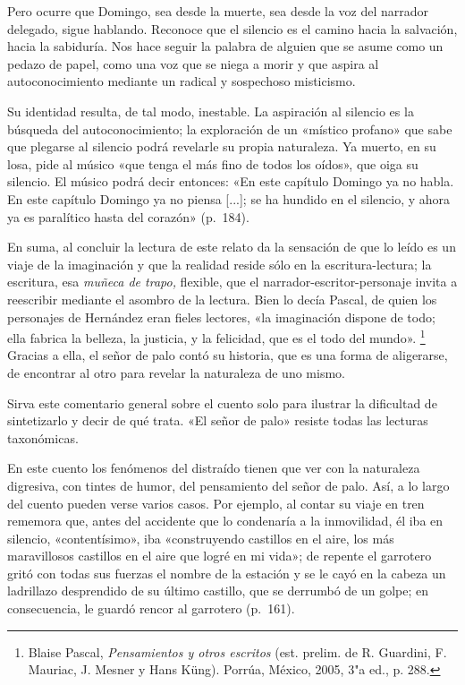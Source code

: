 \documentclass[14pt,twoside,final]{extbook} %
\let\oldfootnote\footnote
\renewcommand\footnote[1]{%
\oldfootnote{\hspace{1mm}#1}}
\begin{document}
Pero ocurre que Domingo, sea desde la muerte, sea desde la voz del narrador delegado, sigue hablando. Reconoce que el silencio es el camino hacia la salvación, hacia la sabiduría. Nos hace seguir la palabra de alguien que se asume como un pedazo de papel, como una voz que se niega a morir y que aspira al autoconocimiento mediante un radical y sospechoso misticismo.

Su identidad resulta, de tal modo, inestable. La aspiración al silencio es la búsqueda del autoconocimiento; la exploración de un «místico profano» que sabe que plegarse al silencio podrá revelarle su propia naturaleza. Ya muerto, en su losa, pide al músico «que tenga el más fino de todos los oídos», que oiga su silencio. El músico podrá decir entonces: «En este capítulo Domingo ya no habla. En este capítulo Domingo ya no piensa [...]; se ha hundido en el silencio, y ahora ya es
paralítico hasta del corazón» (p.~184).

En suma, al concluir la lectura de este relato da la sensación de que lo leído es un viaje de la imaginación y que la realidad reside sólo en la escritura-lectura; la escritura, esa \emph{muñeca de trapo,} flexible, que el narrador-escritor-personaje invita a reescribir mediante el asombro de la lectura. Bien lo decía Pascal, de quien los personajes de Hernández eran fieles lectores, «la imaginación dispone de todo; ella fabrica la belleza, la justicia, y la felicidad, que es el todo del mundo».\footnote{Blaise Pascal, \emph{Pensamientos y otros escritos} (est. prelim. de R. Guardini, F. Mauriac, J. Mesner y Hans Küng). Porrúa, México, 2005, 3"a ed., p. 288.} Gracias a ella, el señor de palo contó su historia, que es una forma de aligerarse, de encontrar al otro para revelar la naturaleza de uno mismo.

Sirva este comentario general sobre el cuento solo para ilustrar la dificultad de sintetizarlo y decir de qué trata. «El señor de palo» resiste todas las lecturas taxonómicas.

En este cuento los fenómenos del distraído tienen que ver con la naturaleza digresiva, con tintes de humor, del pensamiento del señor de palo. Así, a lo largo del cuento pueden verse varios casos. Por ejemplo, al contar su viaje en tren rememora que, antes del accidente que lo condenaría a la inmovilidad, él iba en silencio, «contentísimo», iba «construyendo castillos en el aire, los más maravillosos castillos en el aire que logré en mi vida»; de repente el garrotero gritó con todas sus fuerzas el nombre de la estación y se le cayó en la cabeza un ladrillazo desprendido de su último castillo, que se derrumbó de un golpe; en consecuencia, le guardó rencor al garrotero (p.~161).
\end{document}
